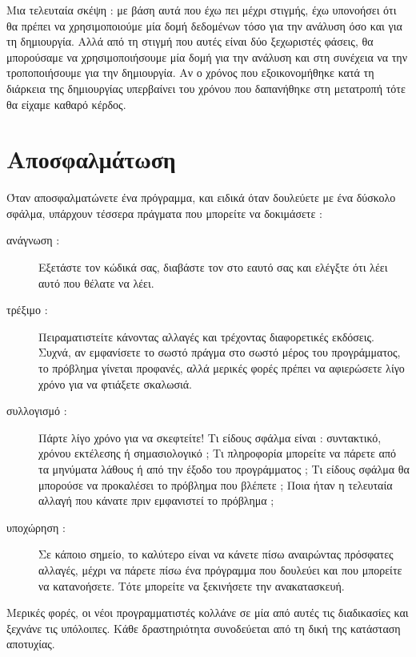 \documentclass[10pt]{book}
\begin{document}
Μια τελευταία σκέψη :  με βάση αυτά που έχω πει μέχρι στιγμής, έχω υπονοήσει ότι θα πρέπει να χρησιμοποιούμε μία 
δομή δεδομένων τόσο για την ανάλυση όσο και για τη δημιουργία. Αλλά από τη στιγμή που αυτές είναι δύο ξεχωριστές φάσεις, θα μπορούσαμε να χρησιμοποιήσουμε μία δομή για την ανάλυση και στη συνέχεια να την τροποποιήσουμε για την δημιουργία. Αν ο χρόνος που εξοικονομήθηκε κατά τη διάρκεια της δημιουργίας υπερβαίνει του χρόνου που δαπανήθηκε στη μετατροπή τότε θα είχαμε καθαρό κέρδος.


\section{Αποσφαλμάτωση}

Όταν αποσφαλματώνετε ένα πρόγραμμα, και ειδικά όταν δουλεύετε με ένα δύσκολο σφάλμα, 
υπάρχουν τέσσερα πράγματα που μπορείτε να δοκιμάσετε :

\begin{description}

\item [ ανάγνωση :]  Εξετάστε τον κώδικά σας, διαβάστε τον στο εαυτό σας και 
ελέγξτε ότι λέει αυτό που θέλατε να λέει. 

\item[ τρέξιμο :]  Πειραματιστείτε κάνοντας αλλαγές και τρέχοντας διαφορετικές 
εκδόσεις. Συχνά, αν εμφανίσετε το σωστό πράγμα στο σωστό μέρος του προγράμματος, το πρόβλημα γίνεται προφανές, αλλά μερικές φορές πρέπει να αφιερώσετε λίγο χρόνο για να φτιάξετε σκαλωσιά.

\item[ συλλογισμό :]  Πάρτε λίγο χρόνο για να σκεφτείτε! Τι είδους σφάλμα είναι :  συντακτικό, χρόνου εκτέλεσης ή σημασιολογικό ;  Τι πληροφορία μπορείτε να πάρετε από τα μηνύματα λάθους ή από την έξοδο του προγράμματος ;  Τι είδους σφάλμα θα μπορούσε να προκαλέσει το πρόβλημα που βλέπετε ;  Ποια ήταν η τελευταία αλλαγή που κάνατε πριν εμφανιστεί το πρόβλημα ;

\item[ υποχώρηση :]  Σε κάποιο σημείο, το καλύτερο είναι να κάνετε πίσω αναιρώντας πρόσφατες αλλαγές, μέχρι να πάρετε πίσω ένα πρόγραμμα που δουλεύει και που μπορείτε να κατανοήσετε. Τότε μπορείτε να ξεκινήσετε την ανακατασκευή. 

\end{description}

 Μερικές φορές, οι νέοι προγραμματιστές κολλάνε σε μία από αυτές τις διαδικασίες 
και ξεχνάνε τις υπόλοιπες. Κάθε δραστηριότητα συνοδεύεται από τη δική της κατάσταση αποτυχίας.
\end{document}
